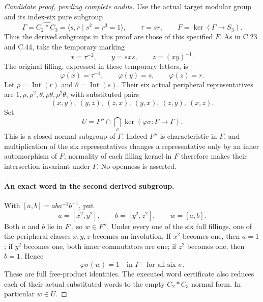 \begin{proof}[Candidate proof, pending complete audits]
Use the actual target modular group and its index-six pure subgroup
\[
 \Gamma=\widehat{C_2*C_3}=\langle s,r\mid s^2=r^3=1\rangle,
 \qquad \tau=sr,\qquad F=\ker(\Gamma\longrightarrow S_3).
\]
Thus the derived subgroups in this proof are those of this specified
$F$. As in C.23 and C.44, take the temporary marking
\[
 x=\tau^{-2},\qquad y=sxs,\qquad z=(xy)^{-1}.
\]
The original filling, expressed in these temporary letters, is
\[
 \varphi(x)=\tau^{-1},\qquad \varphi(y)=s,\qquad
 \varphi(z)=r.                                       \tag{C.46.2}
\]
Let $\rho=\operatorname{Int}(r)$ and
$\theta=\operatorname{Int}(s)$. Their six actual peripheral
representatives are $1,\rho,\rho^2,\theta,\rho\theta,
\rho^2\theta$, with substituted pairs
\[
 (x,y),\ (y,z),\ (z,x),\ (y,x),\ (z,y),\ (x,z).
                                                               \tag{C.46.3}
\]
Set
\[
 U=F''\cap\bigcap_\sigma\ker(\varphi\sigma:F\to\Gamma).
                                                               \tag{C.46.4}
\]
This is a closed normal subgroup of $\Gamma$. Indeed $F''$ is
characteristic in $F$, and multiplication of the six representatives
changes a representative only by an inner automorphism of $F$;
normality of each filling kernel in $F$ therefore makes their
intersection invariant under $\Gamma$. No openness is asserted.

\paragraph{An exact word in the second derived subgroup.}
With $[a,b]=aba^{-1}b^{-1}$, put
\[
 a=[x^2,y^2],\qquad b=[y^2,z^2],\qquad w=[a,b].       \tag{C.46.5}
\]
Both $a$ and $b$ lie in $F'$, so $w\in F''$. Under every one
of the six full fillings, one of the peripheral classes $x,y,z$
becomes an involution. If $x^2$ becomes one, then $a=1$;
if $y^2$ becomes one, both inner commutators are one; if $z^2$
becomes one, then $b=1$. Hence
\[
                 \varphi\sigma(w)=1\quad\text{in }\Gamma
                 \quad\text{for all six }\sigma.    \tag{C.46.6}
\]
These are full free-product identities. The executed word certificate
also reduces each of their actual substituted words to the empty
$C_2*C_3$ normal form. In particular $w\in U$.


\end{proof}
